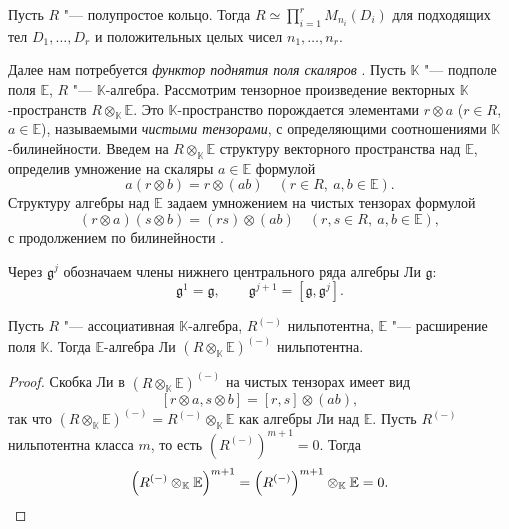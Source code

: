 \documentclass[a4paper,14pt,oneside,openany]{memoir}
\begin{document}
\begin{theorem}\label{th:wedderburn-artin}
    Пусть $R$ "--- полупростое кольцо. Тогда $ R \simeq \prod_{i=1}^r M_{n_i}(D_i)
    $
    для подходящих тел $D_1,\dots,D_r$ и положительных целых чисел $n_1,\dots,n_r$.
\end{theorem}

Далее нам потребуется \emph{функтор поднятия поля скаляров}
\cite[п.~4.1.7]{linalg1986}. Пусть $\mathbb{K}$ "--- подполе поля $\mathbb{E}$,
$R$ "--- $\mathbb{K}$-алгебра. Рассмотрим тензорное произведение векторных
$\mathbb{K}$-пространств $R\otimes_{\mathbb{K}}\mathbb{E}$. Это
$\mathbb{K}$-пространство порождается элементами $r\otimes a$ ($r\in R$,
$a\in\mathbb{E}$), называемыми \emph{чистыми тензорами}, с определяющими
соотношениями $\mathbb{K}$-билинейности. Введем на
$R\otimes_{\mathbb{K}}\mathbb{E}$ структуру векторного пространства над
$\mathbb{E}$, определив умножение на скаляры $a \in \mathbb{E}$ формулой
\[
    a(r \otimes b) = r \otimes (ab)\quad (r \in R,\ a,b \in \mathbb{E}).
\]
Структуру алгебры над $\mathbb{E}$ задаем умножением на чистых тензорах
формулой
\[
    (r\otimes a)(s \otimes b) = (rs) \otimes (ab)\quad (r,s \in R,\ a,b \in \mathbb{E}),
\]
с продолжением по билинейности \cite[\S~5.4]{bresar2025}.

Через $\mathfrak{g}^j$ обозначаем члены нижнего центрального ряда алгебры Ли
$\mathfrak{g}$:
\[
    \mathfrak{g}^1=\mathfrak{g},\qquad
    \mathfrak{g}^{j+1}=[\mathfrak{g},\mathfrak{g}^j].
\]

\begin{lemma}\label{l:extension-scalars-nilpotent-lie}
    Пусть $R$ "--- ассоциативная $\mathbb{K}$-алгебра, $R^{(-)}$ нильпотентна,
    $\mathbb{E}$ "--- расширение поля $\mathbb{K}$. Тогда $\mathbb{E}$-алгебра Ли
    $(R\otimes_{\mathbb{K}}\mathbb{E})^{(-)}$ нильпотентна.
\end{lemma}
\begin{proof}
    Скобка Ли в $(R\otimes_{\mathbb{K}}\mathbb{E})^{(-)}$ на чистых тензорах имеет
    вид
    \[
        [r\otimes a,s\otimes b]=[r,s]\otimes(ab),
    \]
    так что
    $(R\otimes_{\mathbb{K}}\mathbb{E})^{(-)}=R^{(-)}\otimes_{\mathbb{K}}\mathbb{E}$
    как алгебры Ли над $\mathbb{E}$. Пусть $R^{(-)}$ нильпотентна класса $m$, то
    есть $(R^{(-)})^{m+1}=0$. Тогда
    \[
        \left(R^{(-)}\otimes_{\mathbb{K}}\mathbb{E}\right)^{m+1} =
        \left(R^{(-)}\right)^{m+1}\otimes_{\mathbb{K}}\mathbb{E}=0.\qedhere
    \]
\end{proof}
\end{document}
